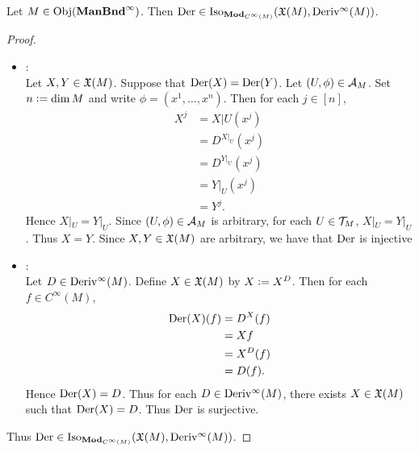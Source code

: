\documentclass{book}
\begin{document}
\begin{ex}
	Let $M \in \operatorname{Obj}(\operatorname*{\text{\textbf{ManBnd}}^{\infty}})$. Then $\text{Der} \in \operatorname{Iso}_{\operatorname*{\text{\textbf{Mod}}}_{C^{\infty}(M)}}(\mathfrak{X}(M), \operatorname{Deriv^{\infty}}(M))$.
\end{ex}

\begin{proof}\
	\begin{itemize}
		\item {}: \\
		Let $X, Y \in \mathfrak{X}(M)$. Suppose that $\text{Der}(X) = \text{Der}(Y)$. Let $(U, \phi) \in \mathcal{A}_M$. Set $n \vcentcolon= \dim M$ and write $\phi = (x^1, \ldots, x^n)$. Then for each $j \in [n]$,
		\begin{align*}
			X^j
			& = X|U(x^j) \\
			& = D^{X|_U}(x^j) \\
			& = D^{Y|_U}(x^j) \\
			& = Y|_U(x^j) \\
			& = Y^j.
		\end{align*}
		Hence $X|_U = Y|_U$. Since $(U, \phi) \in \mathcal{A}_M$ is arbitrary, for each $U \in \mathcal{T}_M$, $X|_U = Y|_U$. Thus $X = Y$. Since $X, Y \in \mathfrak{X}(M)$ are arbitrary, we have that $\text{Der}$ is injective
		\item \tbf{(sujectivity)}: \\
		Let $D \in \operatorname{Deriv^{\infty}}(M)$. Define $X \in \mathfrak{X}(M)$ by $X \vcentcolon= X^D$. Then for each $f \in C^{\infty}(M)$, 
		\begin{align*}
			\text{Der}(X)(f) 
			& = D^X(f) \\
			& = Xf \\
			& = X^D(f) \\
			& = D(f).
		\end{align*}
		Hence $\text{Der}(X) = D$. Thus for each $D \in \operatorname{Deriv^{\infty}}(M)$, there exists $X \in \mathfrak{X}(M)$ such that $\text{Der}(X) = D$. Thus $\text{Der}$ is surjective. 
	\end{itemize}
	Thus $\text{Der} \in \operatorname{Iso}_{\operatorname*{\text{\textbf{Mod}}}_{C^{\infty}(M)}}(\mathfrak{X}(M), \operatorname{Deriv^{\infty}}(M))$.
\end{proof}
\end{document}
